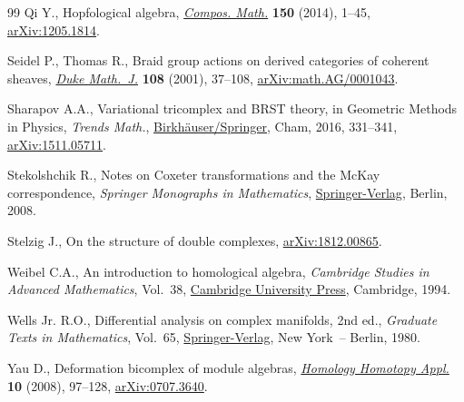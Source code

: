 \documentclass[pdftex]{sigma}
\theoremstyle{definition}
\numberwithin{equation}{section}
\begin{document}
\begin{thebibliography}{99}
Qi Y., Hopfological algebra, \href{https://doi.org/10.1112/S0010437X13007380}{\textit{Compos. Math.}} \textbf{150} (2014), 1--45,
 \href{https://arxiv.org/abs/1205.1814}{arXiv:1205.1814}.

Seidel P., Thomas R., Braid group actions on derived categories of coherent
 sheaves, \href{https://doi.org/10.1215/S0012-7094-01-10812-0}{\textit{Duke Math.~J.}} \textbf{108} (2001), 37--108,
 \href{https://arxiv.org/abs/math.AG/0001043}{arXiv:math.AG/0001043}.

Sharapov A.A., Variational tricomplex and {BRST} theory, in Geometric Methods
 in Physics, \textit{Trends Math.}, \href{https://doi.org/10.1007/978-3-319-31756-4_26}{Birkh\"auser/Springer}, Cham, 2016, 331--341, \href{https://arxiv.org/abs/1511.05711}{arXiv:1511.05711}.

Stekolshchik R., Notes on {C}oxeter transformations and the {M}c{K}ay
 correspondence, \textit{Springer Monographs in Mathematics}, \href{https://doi.org/10.1007/978-3-540-77399-3}{Springer-Verlag}, Berlin,
 2008.

Stelzig J., On the structure of double complexes, \href{https://arxiv.org/abs/1812.00865}{arXiv:1812.00865}.

Weibel C.A., An introduction to homological algebra, \textit{Cambridge Studies
 in Advanced Mathematics}, Vol.~38, \href{https://doi.org/10.1017/CBO9781139644136}{Cambridge University Press}, Cambridge, 1994.

Wells Jr. R.O., Differential analysis on complex manifolds, 2nd ed., \textit{Graduate
 Texts in Mathematics}, Vol.~65, \href{https://doi.org/10.1007/978-0-387-73892-5}{Springer-Verlag}, New York~-- Berlin, 1980.

Yau D., Deformation bicomplex of module algebras, \href{https://doi.org/10.4310/HHA.2008.v10.n1.a5}{\textit{Homology Homotopy
 Appl.}} \textbf{10} (2008), 97--128, \href{https://arxiv.org/abs/0707.3640}{arXiv:0707.3640}.

\end{thebibliography}\LastPageEnding
\end{document}
